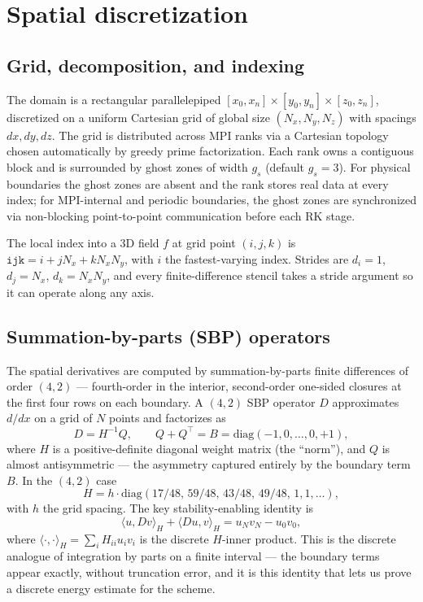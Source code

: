 \documentclass[11pt]{article}
\begin{document}
\section{Spatial discretization}
\label{sec:spatial}

\subsection{Grid, decomposition, and indexing}

The domain is a rectangular parallelepiped
$[x_0, x_n] \times [y_0, y_n] \times [z_0, z_n]$, discretized on a
uniform Cartesian grid of global size $(N_x, N_y, N_z)$ with spacings
$dx, dy, dz$. The grid is distributed across MPI ranks via a Cartesian
topology chosen automatically by greedy prime factorization. Each rank
owns a contiguous block and is surrounded by ghost zones of width
$g_s$ (default $g_s = 3$). For physical boundaries the ghost zones are
absent and the rank stores real data at every index; for MPI-internal
and periodic boundaries, the ghost zones are synchronized via
non-blocking point-to-point communication before each RK stage.

The local index into a 3D field $f$ at grid point $(i, j, k)$ is
$\mathtt{ijk} = i + j N_x + k N_x N_y$, with $i$ the fastest-varying
index. Strides are $d_i = 1$, $d_j = N_x$, $d_k = N_x N_y$, and every
finite-difference stencil takes a stride argument so it can operate
along any axis.

\subsection{Summation-by-parts (SBP) operators}
\label{sec:sbp-operators}

The spatial derivatives are computed by summation-by-parts finite
differences of order $(4,2)$ — fourth-order in the interior, second-order
one-sided closures at the first four rows on each boundary. A $(4,2)$
SBP operator $D$ approximates $d/dx$ on a grid of $N$ points and
factorizes as
\begin{equation}
  D = H^{-1} Q, \qquad Q + Q^\top = B = \mathrm{diag}(-1, 0, \ldots, 0, +1),
\end{equation}
where $H$ is a positive-definite diagonal weight matrix (the ``norm''),
and $Q$ is almost antisymmetric — the asymmetry captured entirely by the
boundary term $B$. In the $(4,2)$ case
\begin{equation}
  H = h \cdot \mathrm{diag}(17/48,\, 59/48,\, 43/48,\, 49/48,\, 1, 1, \ldots),
\end{equation}
with $h$ the grid spacing. The key stability-enabling identity is
\begin{equation}
  \langle u, D v \rangle_H + \langle Du, v \rangle_H = u_N v_N - u_0 v_0,
\end{equation}
where $\langle \cdot, \cdot \rangle_H = \sum_i H_{ii} u_i v_i$ is the
discrete $H$-inner product. This is the discrete analogue of integration
by parts on a finite interval — the boundary terms appear exactly,
without truncation error, and it is this identity that lets us prove
a discrete energy estimate for the scheme.
\end{document}
